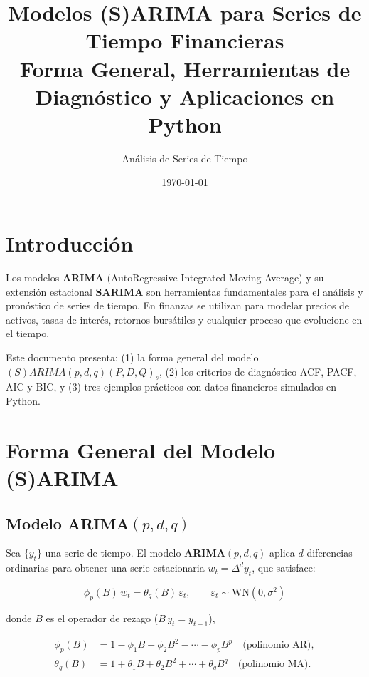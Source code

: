 \documentclass[12pt,a4paper]{article}
\title{
  \textbf{Modelos (S)ARIMA para Series de Tiempo Financieras} \\[0.5em]
  \large Forma General, Herramientas de Diagnóstico y Aplicaciones en Python
}
\author{Análisis de Series de Tiempo}
\date{\today}
\begin{document}
\maketitle
\tableofcontents
\newpage

\section{Introducción}

Los modelos \textbf{ARIMA} (AutoRegressive Integrated Moving Average) y su extensión
estacional \textbf{SARIMA} son herramientas fundamentales para el análisis y pronóstico
de series de tiempo. En finanzas se utilizan para modelar precios de activos, tasas de
interés, retornos bursátiles y cualquier proceso que evolucione en el tiempo.

Este documento presenta: (1) la forma general del modelo $(S)ARIMA(p,d,q)(P,D,Q)_s$,
(2) los criterios de diagnóstico ACF, PACF, AIC y BIC, y (3) tres ejemplos prácticos
con datos financieros simulados en Python.

\section{Forma General del Modelo (S)ARIMA}

\subsection{Modelo ARIMA$(p,d,q)$}

Sea $\{y_t\}$ una serie de tiempo. El modelo \textbf{ARIMA}$(p,d,q)$ aplica $d$
diferencias ordinarias para obtener una serie estacionaria $w_t = \Delta^d y_t$,
que satisface:

\begin{equation}
  \phi_p(B)\,w_t = \theta_q(B)\,\varepsilon_t,
  \qquad \varepsilon_t \sim \mathrm{WN}(0,\sigma^2)
  \label{eq:arima}
\end{equation}

donde $B$ es el operador de rezago ($B\,y_t = y_{t-1}$),

\begin{align}
  \phi_p(B) &= 1 - \phi_1 B - \phi_2 B^2 - \cdots - \phi_p B^p
              \quad \text{(polinomio AR)}, \\
  \theta_q(B) &= 1 + \theta_1 B + \theta_2 B^2 + \cdots + \theta_q B^q
              \quad \text{(polinomio MA)}.
\end{align}
\end{document}
